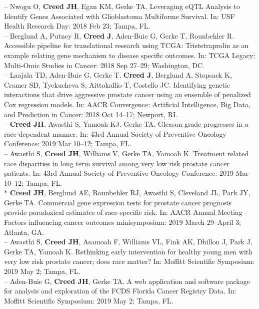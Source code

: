 \documentclass[11pt, a4paper]{article} %
\begin{document}
-- Nwogu O, {\bf Creed JH}, Egan KM, Gerke TA. Leveraging eQTL Analysis to Identify Genes Associated with Glioblastoma Multiforme Survival. In: USF Health Research Day: 2018 Feb 23; Tampa, FL. \\

-- Berglund A, Putney R, {\bf Creed J}, Aden-Buie G, Gerke T, Rounbehler R. Accessible pipeline for translational research using TCGA: Tristetraprolin as an example relating gene mechanism to disease specific outcomes. In: TCGA Legacy: Multi-Omic Studies in Cancer: 2018 Sep 27--29; Washington, DC.\\

-- Laajala TD, Aden-Buie G, Gerke T, {\bf Creed J}, Berglund A, Stopsack K, Cramer SD, Tyekucheva S, Aittokallio T, Costello JC. Identifying genetic interactions that drive aggressive prostate cancer using an ensemble of penalized Cox regression models.  In: AACR Convergence: Artificial Intelligence, Big Data, and Prediction in Cancer: 2018 Oct 14--17; Newport, RI. \\

-- {\bf Creed JH}, Awasthi S, Yamoah KJ, Gerke TA. Gleason grade progresses in a race-dependent manner. In: 43rd Annual Society of Preventive Oncology Conference: 2019 Mar 10--12; Tampa, FL. \\

-- Awasthi S, {\bf Creed JH}, Williams V, Gerke TA, Yamoah K. Treatment related race disparities in long term survival among very low risk prostate cancer patients. In: 43rd Annual Society of Preventive Oncology Conference: 2019 Mar 10--12; Tampa, FL. \\

$*$ {\bf Creed JH}, Berglund AE, Rounbehler RJ, Awasthi S, Cleveland JL, Park JY, Gerke TA. Commercial gene expression tests for prostate cancer prognosis provide  paradoxical estimates of race-specific risk. In: AACR Annual Meeting - Factors influencing cancer outcomes minisymposium: 2019 March 29--April 3; Atlanta, GA. \\

-- Awasthi S, {\bf Creed JH}, Asamoah F, Williams VL, Fink AK, Dhillon J, Park J, Gerke TA, Yamoah K. Rethinking early intervention for healthy young men with very low risk prostate cancer; does race matter? In: Moffitt Scientific Symposium: 2019 May 2; Tampa, FL. \\

-- Aden-Buie G, {\bf Creed JH}, Gerke TA. A web application and software package for analysis and exploration of the FCDS Florida Cancer Registry Data. In: Moffitt Scientific Symposium: 2019 May 2; Tampa, FL. \\
\end{document}
